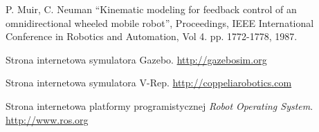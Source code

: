 \begin{thebibliography}{0}

 P. Muir, C. Neuman “Kinematic modeling for feedback control of an
omnidirectional wheeled mobile robot”, Proceedings, IEEE International
Conference in Robotics and Automation, Vol 4. pp. 1772-1778, 1987.

Strona internetowa symulatora Gazebo.
\url{http://gazebosim.org}

Strona internetowa symulatora V-Rep.
\url{http://coppeliarobotics.com}

Strona internetowa platformy programistycznej \emph{Robot Operating System}.
\url{http://www.ros.org}

\end{thebibliography}